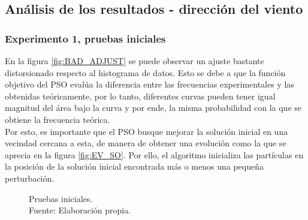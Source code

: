 \subsection{Análisis de los resultados - dirección del viento}
\subsubsection{Experimento 1, pruebas iniciales}

En la figura \ref{fig:BAD_ADJUST} se puede observar un ajuste bastante distorsionado respecto al histograma de datos. Esto se debe a que la función objetivo del PSO evalúa la diferencia entre las frecuencias experimentales y las obtenidas teóricamente, por lo tanto, diferentes curvas pueden tener igual magnitud del área bajo la curva y por ende, la misma probabilidad con la que se obtiene la frecuencia teórica.\\
Por esto, es importante que el PSO busque mejorar la solución inicial en una vecindad cercana a esta, de manera de obtener una evolución como la que se aprecia en la figura \ref{fig:EV_SO}. Por ello, el algoritmo inicializa las partículas en la posición de la solución inicial encontrada más o menos una pequeña perturbación.   
\begin{figure}[ht!]
     \centering
    \caption{Pruebas iniciales.\\ Fuente: Elaboración propia.}
    \label{fig:subfigures}
\end{figure}

